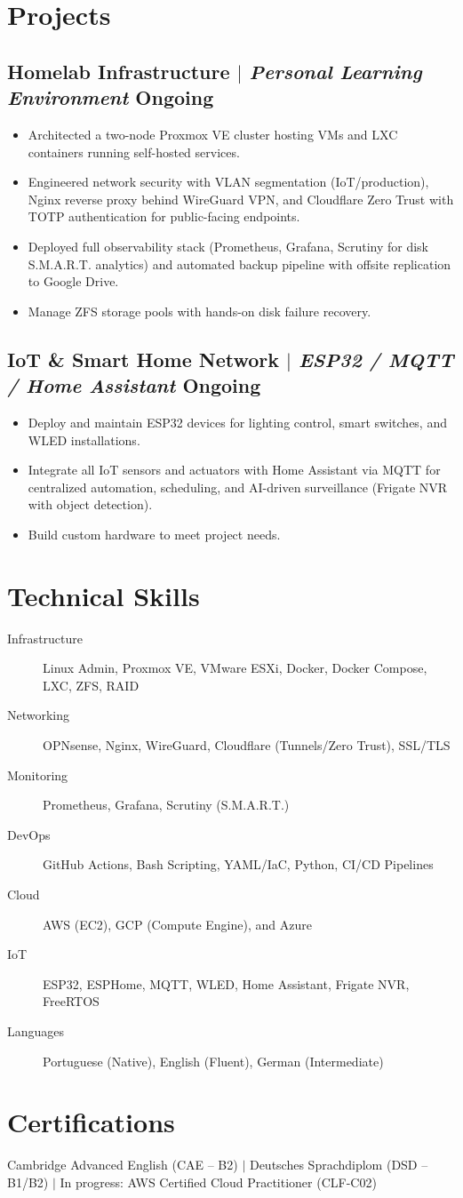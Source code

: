 \documentclass[11.5pt]{article}
\begin{document}
\section{Projects}
\subsection{Homelab Infrastructure $|$ \normalfont\textit{Personal Learning Environment} \hfill Ongoing}
\begin{itemize}
	\item Architected a two-node Proxmox VE cluster hosting VMs and LXC containers running self-hosted services.
	\item Engineered network security with VLAN segmentation (IoT/production), Nginx reverse proxy behind WireGuard VPN, and Cloudflare Zero Trust with TOTP authentication for public-facing endpoints.
	\item Deployed full observability stack (Prometheus, Grafana, Scrutiny for disk S.M.A.R.T. analytics) and automated backup pipeline with offsite replication to Google Drive.
	\item Manage ZFS storage pools with hands-on disk failure recovery.
\end{itemize}

\subsection{IoT \& Smart Home Network $|$ \normalfont\textit{ESP32 / MQTT / Home Assistant} \hfill Ongoing}
\begin{itemize}
	\item Deploy and maintain ESP32 devices for lighting control, smart switches, and WLED installations.
	\item Integrate all IoT sensors and actuators with Home Assistant via MQTT for centralized automation, scheduling, and AI-driven surveillance (Frigate NVR with object detection).
	\item Build custom hardware to meet project needs.
\end{itemize}

\section{Technical Skills}
\begin{description}
	\item[Infrastructure] Linux Admin, Proxmox VE, VMware ESXi, Docker, Docker Compose, LXC, ZFS, RAID
	\item[Networking] OPNsense, Nginx, WireGuard, Cloudflare (Tunnels/Zero Trust), SSL/TLS
	\item[Monitoring] Prometheus, Grafana, Scrutiny (S.M.A.R.T.)
	\item[DevOps] GitHub Actions, Bash Scripting, YAML/IaC, Python, CI/CD Pipelines
	\item[Cloud] AWS (EC2), GCP (Compute Engine), and Azure
	\item[IoT] ESP32, ESPHome, MQTT, WLED, Home Assistant, Frigate NVR, FreeRTOS
	\item[Languages] Portuguese (Native), English (Fluent), German (Intermediate)
\end{description}

\section{Certifications}
Cambridge Advanced English (CAE -- B2) $|$ Deutsches Sprachdiplom (DSD -- B1/B2) $|$ In progress: AWS Certified Cloud Practitioner (CLF-C02)
\end{document}
